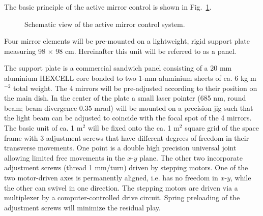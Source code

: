 The basic principle of the active mirror control is shown in Fig.~\ref{fig-active}.

\begin{figure}[htb]
\begin{center}
\caption{Schematic view of the active
mirror control system.}
\label{fig-active}
\end{center}
\end{figure}



Four
mirror elements will be pre-mounted on a lightweight, rigid support plate
measuring 98 $\times $ 98 cm. Hereinafter this unit will be referred to as a
panel.

The support plate is a commercial sandwich panel consisting of a 20 mm aluminium
HEXCELL core bonded to two 1-mm aluminium sheets of ca. 6 kg m$^{-2}$ total weight.
The 4 mirrors will be pre-adjusted according to their position on the main
dish. In the center of the plate a small laser pointer (685 nm, round beam;
beam divergence 0.35 mrad) will be mounted on a precision jig such that the
light beam can be adjusted to coincide with the focal spot of the 4 mirrors.
The basic unit of ca. 1 m$^2$ will be fixed onto the ca. 1 m$^2$ square grid
of the space frame with 3 adjustment screws that have different degrees of
freedom in their transverse movements. One point is a double high precision
universal joint allowing limited free movements in the $x$-$y $ plane. The
other two incorporate adjustment screws (thread 1 mm/turn) driven by
stepping motors. One of the two motor-driven axes is permanently aligned,
i.e. has no freedom in $x$-$y$, while the other can swivel in one direction.
The stepping motors are driven via a multiplexer by a computer-controlled
drive circuit. Spring preloading of the adjustment screws will minimize the
residual play.

